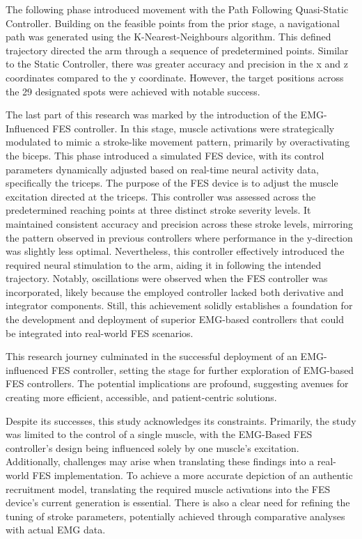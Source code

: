 The following phase introduced movement with the Path Following Quasi-Static Controller. Building on the feasible points from the prior stage, a navigational path was generated using the K-Nearest-Neighbours algorithm. This defined trajectory directed the arm through a sequence of predetermined points. Similar to the Static Controller, there was greater accuracy and precision in the x and z coordinates compared to the y coordinate. However, the target positions across the 29 designated spots were achieved with notable success.

The last part of this research was marked by the introduction of the EMG-Influenced FES controller. In this stage, muscle activations were strategically modulated to mimic a stroke-like movement pattern, primarily by overactivating the biceps. This phase introduced a simulated FES device, with its control parameters dynamically adjusted based on real-time neural activity data, specifically the triceps. The purpose of the FES device is to adjust the muscle excitation directed at the triceps. This controller was assessed across the predetermined reaching points at three distinct stroke severity levels. It maintained consistent accuracy and precision across these stroke levels, mirroring the pattern observed in previous controllers where performance in the y-direction was slightly less optimal. Nevertheless, this controller effectively introduced the required neural stimulation to the arm, aiding it in following the intended trajectory. Notably, oscillations were observed when the FES controller was incorporated, likely because the employed controller lacked both derivative and integrator components. Still, this achievement solidly establishes a foundation for the development and deployment of superior EMG-based controllers that could be integrated into real-world FES scenarios.

This research journey culminated in the successful deployment of an EMG-influenced FES controller, setting the stage for further exploration of EMG-based FES controllers. The potential implications are profound, suggesting avenues for creating more efficient, accessible, and patient-centric solutions.

Despite its successes, this study acknowledges its constraints. Primarily, the study was limited to the control of a single muscle, with the EMG-Based FES controller's design being influenced solely by one muscle's excitation. Additionally, challenges may arise when translating these findings into a real-world FES implementation. To achieve a more accurate depiction of an authentic recruitment model, translating the required muscle activations into the FES device's current generation is essential. There is also a clear need for refining the tuning of stroke parameters, potentially achieved through comparative analyses with actual EMG data.

